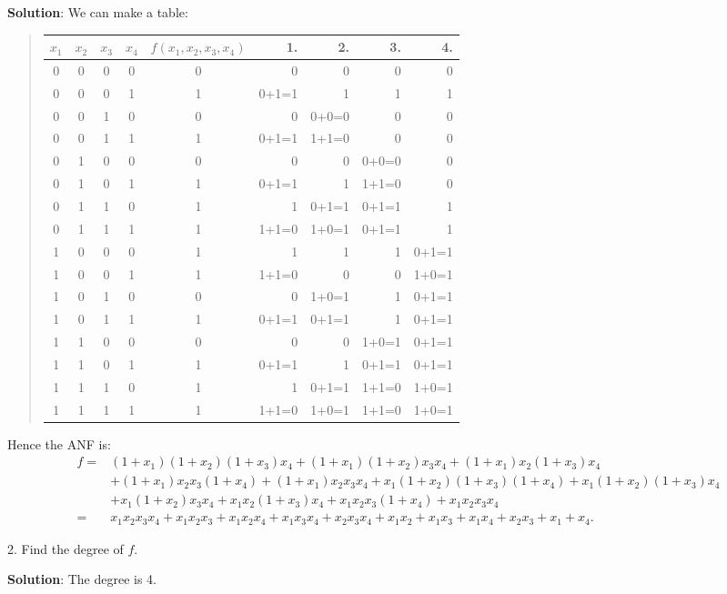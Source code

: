 \documentclass[12pt]{article}
\theoremstyle{plain}
\begin{document}
{\bf Solution}: We can make a table:
\begin{quote}
\begin{tabular}{c c c c| c || r || r || r || r}
$x_1$ & $x_2$ & $x_3$ & $x_4$ & $f(x_1, x_2, x_3, x_4)$ & 1. & 2. & 3. & 4. \\
\hline
0 & 0 & 0 & 0 & 0 & 0 		&		0		& 0 		& 0\\
0 & 0 & 0 & 1 & 1 & 0+1=1 &		1		& 1 		& 1\\
0 & 0 & 1 & 0 & 0 & 0 		& 0+0=0	& 0 		& 0\\
0 & 0 & 1 & 1 & 1 & 0+1=1	&	1+1=0	& 0 		& 0\\
0 & 1 & 0 & 0 & 0 & 0			&		0		& 0+0=0 & 0\\
0 & 1 & 0 & 1 & 1 & 0+1=1	&		1		& 1+1=0 & 0\\
0 & 1 & 1 & 0 & 1 & 1			& 0+1=1	& 0+1=1 & 1\\
0 & 1 & 1 & 1 & 1 & 1+1=0	&	1+0=1	& 0+1=1 & 1\\
1 & 0 & 0 & 0 & 1 & 1			&		1		& 1 		& 0+1=1\\
1 & 0 & 0 & 1 & 1 & 1+1=0	&		0		& 0 		& 1+0=1\\
1 & 0 & 1 & 0 & 0 & 0			&	1+0=1 & 1 		& 0+1=1\\
1 & 0 & 1 & 1 & 1 & 0+1=1	&	0+1=1	& 1 		& 0+1=1\\
1 & 1 & 0 & 0 & 0 & 0			&		0		& 1+0=1 & 0+1=1\\
1 & 1 & 0 & 1 & 1 & 0+1=1	&		1		& 0+1=1 & 0+1=1\\
1 & 1 & 1 & 0 & 1 & 1			&	0+1=1	& 1+1=0 & 1+0=1\\
1 & 1 & 1 & 1 & 1 & 1+1=0	&	1+0=1	& 1+1=0 & 1+0=1\\
\end{tabular}
\end{quote}
Hence the ANF is: 
$$\begin{aligned}
f =& (1+x_1)(1+x_2)(1+x_3)x_4 + (1+x_1)(1+x_2)x_3 x_4 + (1+x_1)x_2(1+x_3)x_4 \\
&+ (1+x_1)x_2 x_3(1+x_4) + (1+x_1)x_2 x_3 x_4 + x_1(1+x_2)(1+x_3)(1+x_4) + x_1(1+x_2)(1+x_3)x_4 \\
&+ x_1(1+x_2)x_3 x_4 + x_1 x_2 (1+x_3) x_4 + x_1 x_2 x_3 (1+x_4) + x_1 x_2 x_3 x_4 \\
=& x_1x_2x_3x_4 + x_1x_2x_3 + x_1x_2x_4 + x_1x_3x_4 + x_2x_3x_4 + x_1x_2 
+ x_1x_3 + x_1x_4 + x_2x_3 + x_1 + x_4.
\end{aligned}$$

2. Find the degree of $f$.

{\bf Solution}: The degree is 4.
\end{document}
